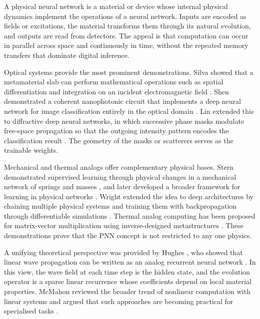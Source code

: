 A physical neural network is a material or device whose internal physical dynamics implement the operations of a neural network.
Inputs are encoded as fields or excitations, the material transforms them through its natural evolution, and outputs are read from detectors.
The appeal is that computation can occur in parallel across space and continuously in time, without the repeated memory transfers that dominate digital inference.

Optical systems provide the most prominent demonstrations.
Silva \etal showed that a metamaterial slab can perform mathematical operations such as spatial differentiation and integration on an incident electromagnetic field \cite{silva2014performing}.
Shen \etal demonstrated a coherent nanophotonic circuit that implements a deep neural network for image classification entirely in the optical domain \cite{shen2017deep}.
Lin \etal extended this to diffractive deep neural networks, in which successive phase masks modulate free-space propagation so that the outgoing intensity pattern encodes the classification result \cite{lin2018alloptical}.
The geometry of the masks or scatterers serves as the trainable weights.

Mechanical and thermal analogs offer complementary physical bases.
Stern \etal demonstrated supervised learning through physical changes in a mechanical network of springs and masses \cite{stern2020supervised}, and later developed a broader framework for learning in physical networks \cite{stern2021physical}.
Wright \etal extended the idea to deep architectures by chaining multiple physical systems and training them with backpropagation through differentiable simulations \cite{wright2022deep}.
Thermal analog computing has been proposed for matrix-vector multiplication using inverse-designed metastructures \cite{silva2026thermal}.
These demonstrations prove that the PNN concept is not restricted to any one physics.

A unifying theoretical perspective was provided by Hughes \etal, who showed that linear wave propagation can be written as an analog recurrent neural network \cite{hughes2019wave}.
In this view, the wave field at each time step is the hidden state, and the evolution operator is a sparse linear recurrence whose coefficients depend on local material properties.
McMahon reviewed the broader trend of nonlinear computation with linear systems and argued that such approaches are becoming practical for specialised tasks \cite{mcmahon2024nonlinear}.

